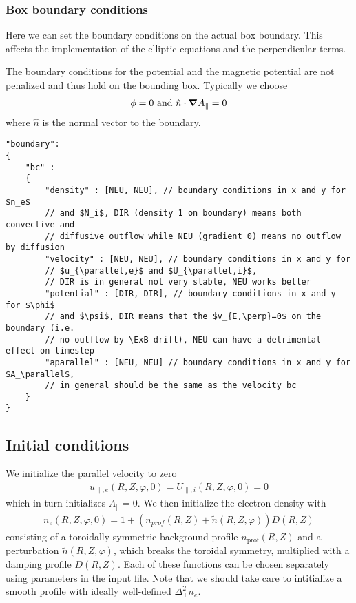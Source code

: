 \subsubsection{Box boundary conditions}
Here we can set the boundary conditions on the actual box boundary.
This affects the implementation of the elliptic equations and the
perpendicular terms.

The boundary conditions for the potential and the magnetic potential are not
penalized and thus hold on the bounding box. Typically we choose
\begin{align}
\phi = 0
\text{ and }  \hat n \cdot{\boldsymbol{\nabla}} A_{\parallel} = 0
\end{align}
where $\hat n$ is the normal vector to the boundary.

\begin{verbatim}
"boundary":
{
    "bc" :
    {
        "density" : [NEU, NEU], // boundary conditions in x and y for $n_e$
        // and $N_i$, DIR (density 1 on boundary) means both convective and
        // diffusive outflow while NEU (gradient 0) means no outflow by diffusion
        "velocity" : [NEU, NEU], // boundary conditions in x and y for
        // $u_{\parallel,e}$ and $U_{\parallel,i}$,
        // DIR is in general not very stable, NEU works better
        "potential" : [DIR, DIR], // boundary conditions in x and y for $\phi$
        // and $\psi$, DIR means that the $v_{E,\perp}=0$ on the boundary (i.e.
        // no outflow by \ExB drift), NEU can have a detrimental effect on timestep
        "aparallel" : [NEU, NEU] // boundary conditions in x and y for $A_\parallel$,
        // in general should be the same as the velocity bc
    }
}
\end{verbatim}

\subsection{Initial conditions} \label{sec:initial}
We initialize the parallel velocity to zero
\begin{align}
  u_{\parallel,e}(R,Z,\varphi,0) = U_{\parallel,i}(R,Z,\varphi,0) = 0
  \label{}
\end{align}
which in turn initializes $A_\parallel = 0$.
We then initialize the electron density with
\begin{align} \label{eq:initial_ne}
    n_e(R,Z,\varphi, 0)= 1 + (n_{prof}(R,Z) + \tilde n(R,Z,\varphi)) D(R,Z)
\end{align}
consisting of a toroidally symmetric background profile $n_{\text{prof}}(R,Z)$ and a perturbation
$\tilde n(R,Z,\varphi)$, which breaks the toroidal symmetry, multiplied with a
damping profile $D(R,Z)$.
Each of these functions can be chosen separately using parameters in the
input file.
Note that we should take care to intitialize a smooth profile with ideally well-defined $\Delta^2_\perp n_e$.

